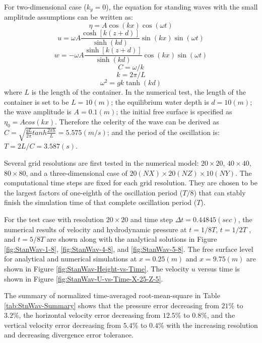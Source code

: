 For two-dimensional case ($k_y=0$), the equation for standing waves with the small amplitude assumptions can be written as:
\begin{equation}
\eta = A \cos(kx)\cos(\omega t)
\end{equation}
\begin{equation}
u=\omega A \frac{\cosh[k(z+d)]}{\sinh(kd)}\sin(kx)\sin(\omega t)
\end{equation}
\begin{equation}
w=-\omega A \frac{\sinh[k(z+d)]}{\sinh(kd)}\cos(kx)\sin(\omega t)
\end{equation}
\begin{equation}
C= \omega /k
\end{equation}
\begin{equation}
k=2 \pi/L
\end{equation}
\begin{equation}
\omega^2=gk \tanh(kd)
\end{equation}
where $L$ is the length of the container. In the numerical test, the length of the container is set to be $L=10(m)$;
the equilibrium water depth is $d=10(m)$; the wave amplitude is
$A=0.1(m)$; the initial free surface is specified as $\eta_0 = A
cos(kx)$. Therefore the celerity of the wave can be derived as $C= \sqrt{\frac{gL}{2
\pi}tanh \frac{2 \pi h}{L}}=5.575 (m/s)$; and the period of the
oscillation is: $ T=2L/C= 3.587 (s)$.

Several grid resolutions are first tested in the numerical model: $20 \times 20$, $40 \times 40$, $80 \times 80$, and a three-dimensional case of $20(NX) \times 20(NZ) \times 10(NY)$. The computational time steps are fixed for each grid resolution. They are chosen to be the largest factors of one-eighth of the oscillation period ($T/8$) that can stably finish the simulation time of that complete oscillation period ($T$).

For the test case with resolution $20 \times 20$ and time step $\Delta t = 0.44845 (sec)$, the numerical results of velocity and hydrodynamic pressure at $t=1/8T$, $t=1/2T$ , and $t=5/8T$ are shown along with the analytical solutions in Figure \ref{fig:StanWav-1-8}, \ref{fig:StanWav-4-8}, and \ref{fig:StanWav-5-8}. The free surface level for analytical and numerical simulations at $x=0.25(m)$ and $x=9.75(m)$ are shown in Figure \ref{fig:StanWav-Height-vs-Time}. The velocity $u$ versus time is shown in Figure \ref{fig:StanWav-U-vs-Time-X-25-Z-5}.

The summary of normalized time-averaged root-mean-square in Table \ref{tab:StnWav-Summary} shows that the pressure error decreasing from $21\%$ to $3.2\%$, the horizontal velocity error decreasing from $12.5\%$ to $0.8\%$, and the vertical velocity error decreasing from $5.4\%$ to $0.4\%$ with the increasing resolution and decreasing divergence error tolerance.


